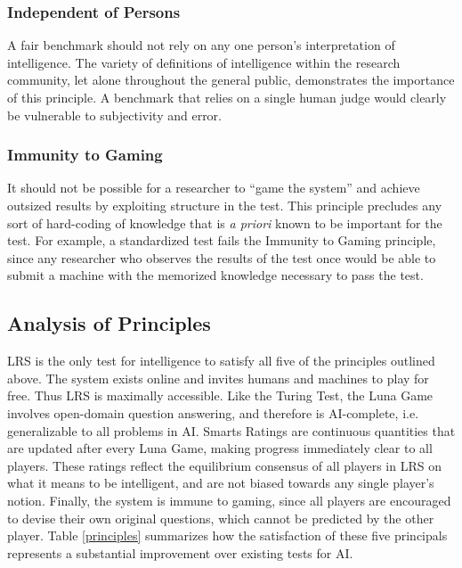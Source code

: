 \subsubsection{Independent of Persons}
A fair benchmark should not rely on any one person's interpretation of intelligence. The variety of definitions of intelligence within the research community, let alone throughout the general public, demonstrates the importance of this principle. A benchmark that relies on a single human judge would clearly be vulnerable to subjectivity and error.

\subsubsection{Immunity to Gaming}
It should not be possible for a researcher to ``game the system'' and achieve outsized results by exploiting structure in the test. This principle precludes any sort of hard-coding of knowledge that is \textit{a priori} known to be important for the test. For example, a standardized test fails the Immunity to Gaming principle, since any researcher who observes the results of the test once would be able to submit a machine with the memorized knowledge necessary to pass the test. 

\subsection{Analysis of Principles}

LRS is the only test for intelligence to satisfy all five of the principles outlined above. The system exists online and invites humans and machines to play for free. Thus LRS is maximally accessible. Like the Turing Test, the Luna Game involves open-domain question answering, and therefore is AI-complete, i.e. generalizable to all problems in AI. Smarts Ratings are continuous quantities that are updated after every Luna Game, making progress immediately clear to all players. These ratings reflect the equilibrium consensus of all players in LRS on what it means to be intelligent, and are not biased towards any single player's notion. Finally, the system is immune to gaming, since all players are encouraged to devise their own original questions, which cannot be predicted by the other player. Table \ref{principles} summarizes how the satisfaction of these five principals represents a substantial improvement over existing tests for AI.

